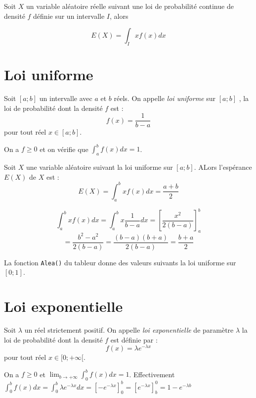 \documentclass[french]{book}
\newcommand{\ds}{\displaystyle}
\newcommand{\cro}[1]{ \ds [#1]}
\newcommand{\dx}{dx}
\begin{document}
\begin{defn}
Soit $X$ un variable aléatoire réelle suivant une loi de probabilité continue de densité $f$ définie sur un intervalle $I$, alors 

$$E(X)= \int_{I}xf(x)\dx$$
\end{defn}


\section{Loi uniforme}

\begin{defn}
 Soit $[a;b]$ un intervalle avec $a$ et $b$ réels. On appelle \emph{loi uniforme} sur $[a;b]$ , la loi de probabilité dont la densité $f$ est :
$$f(x)=\frac{1}{b-a}$$ pour tout réel $x\in[a;b]$.
\end{defn}

\begin{demo}
 On a $f\geq 0$ et on vérifie que $\int_{a}^{b}f(x)\dx=1$.
\end{demo}


\begin{prop}
 Soit $X$ une variable aléatoire suivant la loi uniforme sur $[a;b]$. ALors l'espérance $E(X)$ de $X$ est :
$$E(X)=\int_{a}^{b}xf(x)\dx=\frac{a+b}{2}$$
\end{prop}

\begin{demo}
$$\int_{a}^{b}xf(x)\dx=\int_{a}^{b}x\dfrac{1}{b-a}\dx = \cro{\dfrac{x^2}{2(b-a)}}_a^b$$
$$= \dfrac{b^2-a^2}{2(b-a)}=\dfrac{(b-a)(b+a)}{2(b-a)}=\dfrac{b+a}{2}$$
\end{demo}

\begin{exemple}
 La fonction \texttt{Alea()} du tableur donne des valeurs suivants la loi uniforme sur $[0;1]$.
\end{exemple}


\section{Loi exponentielle}

\begin{defn}
 Soit $\lambda$ un réel strictement positif. On appelle \emph{loi exponentielle} de paramètre $\lambda$ la loi de probabilité dont la densité $f$ est définie par :
$$f(x)=\lambda e^{-\lambda x}$$
pour tout réel $x\in [0;+\infty[$.
\end{defn}

\begin{demo}
 On a $f\geq 0$ et $\lim_{b\rightarrow +\infty}\int_{0}^{b}f(x)\dx=1$. Effectivement
 $\int_{0}^{b}f(x)\dx=\int_{0}^{b}\lambda e^{-\lambda x} \dx= \cro{-e^{-\lambda x}}_0^b=  \cro{e^{-\lambda x}}_b^0=1-e^{-\lambda b}$
\end{demo}
\end{document}
